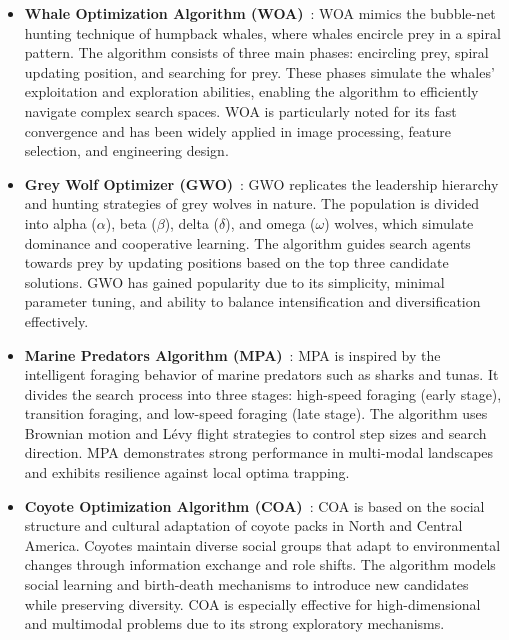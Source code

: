 \documentclass[12pt]{article}
\begin{document}
\begin{itemize}
    \item \textbf{Whale Optimization Algorithm (WOA)}~\cite{mirjalili2016woa}: WOA mimics the bubble-net hunting technique of humpback whales, where whales encircle prey in a spiral pattern. The algorithm consists of three main phases: encircling prey, spiral updating position, and searching for prey. These phases simulate the whales’ exploitation and exploration abilities, enabling the algorithm to efficiently navigate complex search spaces. WOA is particularly noted for its fast convergence and has been widely applied in image processing, feature selection, and engineering design.

    \item \textbf{Grey Wolf Optimizer (GWO)}~\cite{mirjalili2014gwo}: GWO replicates the leadership hierarchy and hunting strategies of grey wolves in nature. The population is divided into alpha (\(\alpha\)), beta (\(\beta\)), delta (\(\delta\)), and omega (\(\omega\)) wolves, which simulate dominance and cooperative learning. The algorithm guides search agents towards prey by updating positions based on the top three candidate solutions. GWO has gained popularity due to its simplicity, minimal parameter tuning, and ability to balance intensification and diversification effectively.

    \item \textbf{Marine Predators Algorithm (MPA)}~\cite{faramarzi2020mpa}: MPA is inspired by the intelligent foraging behavior of marine predators such as sharks and tunas. It divides the search process into three stages: high-speed foraging (early stage), transition foraging, and low-speed foraging (late stage). The algorithm uses Brownian motion and Lévy flight strategies to control step sizes and search direction. MPA demonstrates strong performance in multi-modal landscapes and exhibits resilience against local optima trapping.

    \item \textbf{Coyote Optimization Algorithm (COA)}~\cite{coyoteref}: COA is based on the social structure and cultural adaptation of coyote packs in North and Central America. Coyotes maintain diverse social groups that adapt to environmental changes through information exchange and role shifts. The algorithm models social learning and birth-death mechanisms to introduce new candidates while preserving diversity. COA is especially effective for high-dimensional and multimodal problems due to its strong exploratory mechanisms.


\end{itemize}
\end{document}
